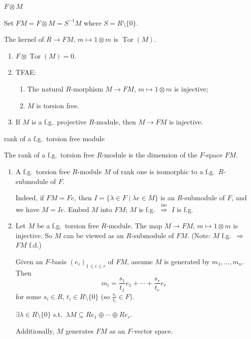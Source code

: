 \documentclass[11pt, a4paper]{report}
\begin{document}
\begin{corollary}
$F \otimes M$

Set $FM = F \otimes M = S^{-1} M$ where $S = R \setminus \{0\}$.

The kernel of $R \to FM$, $m \mapsto 1 \otimes m$ is $\operatorname{Tor}(M)$.

\begin{enumerate}
\item $F \otimes \operatorname{Tor}(M) = 0$.
\item TFAE:
\begin{enumerate}
\item[(i)] The natural $R$-morphism $M \to FM$, $m \mapsto 1 \otimes m$ is injective;
\item[(ii)] $M$ is torsion free.
\end{enumerate}
\item If $M$ is a f.g.\ projective $R$-module, then $M \to FM$ is injective.
\end{enumerate}
\end{corollary}

\begin{definition}
rank of a f.g.\ torsion free module

The rank of a f.g.\ torsion free $R$-module is the dimension of the $F$-space $FM$.
\end{definition}

\begin{remark}
\begin{enumerate}
\item A f.g.\ torsion free $R$-module $M$ of rank one is isomorphic to a f.g.\ $R$-submodule of $F$.

Indeed, if $FM = Fe$, then $I = \{\lambda \in F \mid \lambda e \in M\}$ is an $R$-submodule of $F$, and we have $M = Ie$. Embed $M$ into $FM$; $M$ is f.g.\ $\stackrel{\text{iso}}{\Rightarrow}$ $I$ is f.g.

\item Let $M$ be a f.g.\ torsion free $R$-module. The map $M \to FM$, $m \mapsto 1 \otimes m$ is injective. So $M$ can be viewed as an $R$-submodule of $FM$. (Note: $M$ f.g.\ $\Rightarrow$ $FM$ f.d.)

Given an $F$-basis $(e_{i})_{1 \leq i \leq r}$ of $FM$, assume $M$ is generated by $m_{1}, \ldots, m_{n}$. Then
\[
m_{i} = \frac{s_{1}}{t_{1}} e_{1} + \cdots + \frac{s_{r}}{t_{r}} e_{r}
\]
for some $s_{i} \in R$, $t_{i} \in R \setminus \{0\}$ (so $\frac{s_{i}}{t_{i}} \in F$).

$\exists \lambda \in R \setminus \{0\}$ s.t.\ $\lambda M \subseteq Re_{1} \oplus \cdots \oplus Re_{r}$.

Additionally, $M$ generates $FM$ as an $F$-vector space.
\end{enumerate}
\end{remark}
\end{document}

